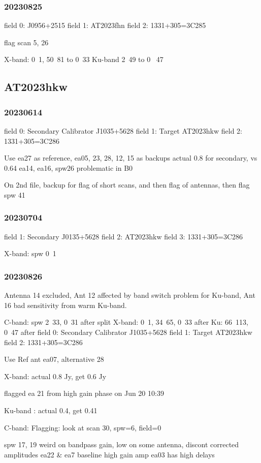 \documentclass[twocolumn,twocolappendix]{aastex631}
\begin{document}
\subsubsection{20230825}
field 0: J0956+2515
field 1: AT2023fhn
field 2: 1331+305=3C285

flag scan 5, 26

X-band: 0~1, 50~81 to 0~33
Ku-band 2~49 to 0 ~47
\subsection{AT2023hkw}

\subsubsection{20230614}
field 0: Secondary Calibrator J1035+5628
field 1: Target AT2023hkw
field 2: 1331+305=3C286

Use ea27 as reference, ea05, 23, 28, 12, 15 as backups
actual 0.8 for secondary, vs 0.64
ea14, ea16, spw26 problematic in B0

On 2nd file, backup for flag of short scans, and then flag of antennas, then flag spw 41

\subsubsection{20230704}
field 1: Secondary J0135+5628
field 2: AT2023hkw
field 3: 1331+305=3C286

X-band: spw 0~1
\subsubsection{20230826}
Antenna 14 excluded, Ant 12 affected by band switch problem for Ku-band, Ant 16 bad sensitivity from warm Ku-band.

C-band: spw 2~33, 0~31 after split
X-band: 0~1, 34~65, 0~33 after
Ku: 66~113, 0~47 after
field 0: Secondary Calibrator J1035+5628
field 1: Target AT2023hkw
field 2: 1331+305=3C286

Use Ref ant ea07, alternative 28

X-band: actual 0.8 Jy, get 0.6 Jy

flagged ea 21 from high gain phase on Jun 20 10:39

Ku-band : actual 0.4, get 0.41

C-band: 
Flagging: look at scan 30, spw=6, field=0

spw 17, 19 weird on bandpass gain, low on some antenna, discont corrected amplitudes
ea22 \& ea7 baseline high gain amp
ea03 has high delays
\end{document}
